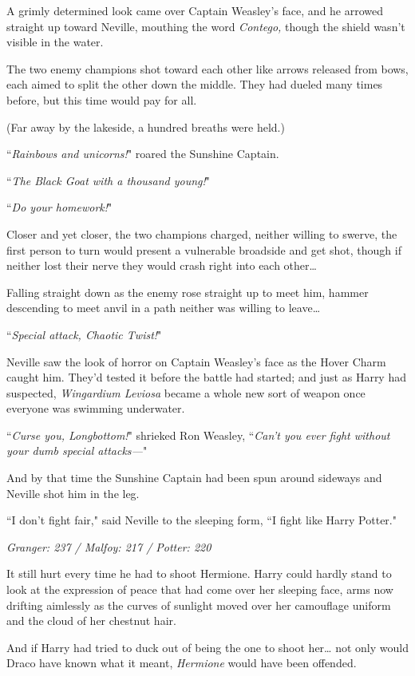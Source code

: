 A grimly determined look came over Captain Weasley's face, and he arrowed straight up toward Neville, mouthing the word \emph{Contego,} though the shield wasn't visible in the water.

The two enemy champions shot toward each other like arrows released from bows, each aimed to split the other down the middle. They had dueled many times before, but this time would pay for all.

(Far away by the lakeside, a hundred breaths were held.)

``\emph{Rainbows and unicorns!}" roared the Sunshine Captain.

``\emph{The Black Goat with a thousand young!}"

``\emph{Do your homework!}"

Closer and yet closer, the two champions charged, neither willing to swerve, the first person to turn would present a vulnerable broadside and get shot, though if neither lost their nerve they would crash right into each other{\ldots}

Falling straight down as the enemy rose straight up to meet him, hammer descending to meet anvil in a path neither was willing to leave{\ldots}

``\emph{Special attack, Chaotic Twist!}"

Neville saw the look of horror on Captain Weasley's face as the Hover Charm caught him. They'd tested it before the battle had started; and just as Harry had suspected, \emph{Wingardium Leviosa} became a whole new sort of weapon once everyone was swimming underwater.

``\emph{Curse you, Longbottom!}" shrieked Ron Weasley, ``\emph{Can't you ever fight without your dumb special attacks—}"

And by that time the Sunshine Captain had been spun around sideways and Neville shot him in the leg.

``I don't fight fair," said Neville to the sleeping form, ``I fight like Harry Potter."

\later

\emph{Granger: 237 / Malfoy: 217 / Potter: 220}

It still hurt every time he had to shoot Hermione. Harry could hardly stand to look at the expression of peace that had come over her sleeping face, arms now drifting aimlessly as the curves of sunlight moved over her camouflage uniform and the cloud of her chestnut hair.

And if Harry had tried to duck out of being the one to shoot her{\ldots} not only would Draco have known what it meant, \emph{Hermione} would have been offended.

